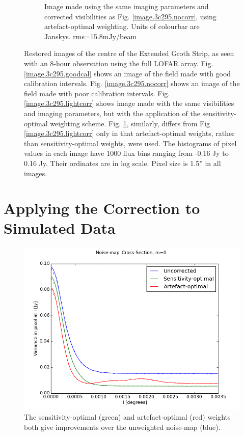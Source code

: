 \begin{figure}[t!]
\begin{subfigure}{.43\textwidth}
\caption{\label{image.3c295.fullcorr} Image made using the same imaging parameters and corrected visibilities as Fig. \ref{image.3c295.nocorr}, using artefact-optimal weighting. {Units of colourbar are Janskys}. rms=15.8mJy/beam}
\end{subfigure}
\caption{\label{image.fourRealImages}Restored images of the centre of the Extended Groth Strip, as seen with an 8-hour observation using the full LOFAR array. Fig. \ref{image.3c295.goodcal} shows an image of the field made with good calibration intervals. Fig. \ref{image.3c295.nocorr} shows an image of the field made with poor calibration intervals. Fig. \ref{image.3c295.lightcorr} shows image made with the same visibilities and imaging parameters, but with the application of the sensitivity-optimal weighting scheme. Fig. \ref{image.3c295.fullcorr}, similarly, differs from Fig \ref{image.3c295.lightcorr} only in that artefact-optimal weights, rather than sensitivity-optimal weights, were used. {The histograms of pixel values in each image have 1000 flux bins ranging from -0.16 Jy to 0.16 Jy. Their ordinates are in log scale.} Pixel size is 1.5'' in all images.}

\end{figure}

\section{Applying the Correction to Simulated Data}\label{section.simulations.application}


\begin{figure}[!t]
    \centering
        \centering
        \includegraphics[width=\linewidth]{images/ctime001-NoisePsfCrossections-backup.png} 
        \caption{The sensitivity-optimal (green) and artefact-optimal (red) weights both give improvements over the unweighted noise-map (blue).} \label{fig.simu.weightapplied}
\end{figure}

